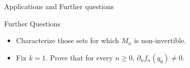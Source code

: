 \documentclass[xcolor = dvipsnames]{beamer}
\begin{document}
\begin{section}{Applications and Further questions}
\begin{frame}{Further Questions}
    \begin{itemize}
        \item Characterize those sets for which $M_n$ is non-invertible.
        \item Fix $k=1$. Prove that for every $n \geq 0$, $\partial_nf_{n}(q_0) \neq 0$.
    \end{itemize}
\end{frame}
\end{section}

\end{document}

